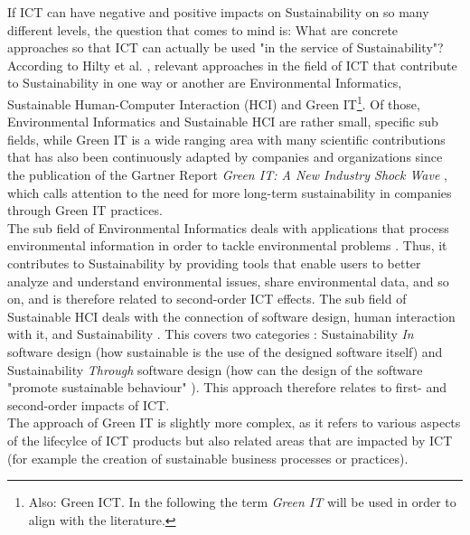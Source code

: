 \documentclass[oribibl]{llncs}
\begin{document}
If ICT can have negative and positive impacts on Sustainability on so many different levels, the question that comes to mind is: What are concrete approaches so that ICT can actually be used "in the service of Sustainability"\cite{hilty11}?\\
According to Hilty et al. \cite{hilty11}, relevant approaches in the field of ICT that contribute to Sustainability in one way or another  are Environmental Informatics, Sustainable Human-Computer Interaction (HCI) %
and Green IT\footnote{Also: Green ICT. In the following the term \textit{Green IT} will be used in order to align with the literature.}. %
Of those, Environmental Informatics and Sustainable HCI are rather small, specific sub fields, while Green IT is a wide ranging area with many scientific contributions that has also been continuously adapted by companies and organizations %
since the publication of the Gartner Report \textit{Green IT: A New Industry Shock Wave} \cite{gartner07}, which calls attention to the need for more long-term sustainability in companies through Green IT practices.\\ %
The sub field of Environmental Informatics deals with applications that process environmental information in order to tackle environmental problems \cite{hilty11}. Thus, it contributes to Sustainability by providing tools that enable users to better analyze and understand environmental issues, share environmental data, and so on, and is therefore related to second-order ICT effects. The sub field of Sustainable HCI deals with the connection of software design, human interaction with it, and Sustainability \cite{hilty11}. This covers two categories \cite{hilty11}: Sustainability \textit{In} software design (how sustainable is the use of the designed software itself) and Sustainability \textit{Through} software design (how can the design of the software "promote sustainable behaviour" \cite{hilty11}). This approach therefore relates to first- and second-order impacts of ICT.\\
The approach of Green IT is slightly more complex, as it refers to various aspects of the lifecylce of ICT products but also related areas that are impacted by ICT (for example the creation of sustainable business processes or practices). %
\end{document}
